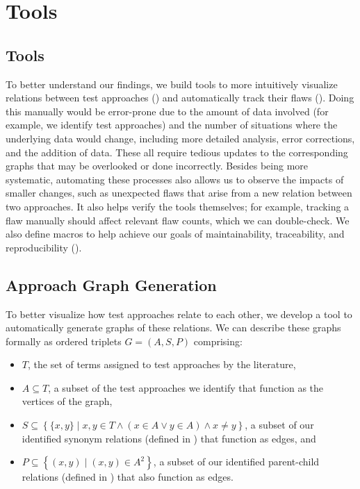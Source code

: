 \ifnotpaper
    \section{Tools}
\else
    \subsection{Tools}
\fi
\label{tools}

\ifnotpaper
    To better understand our findings, we build tools to more intuitively
    visualize relations between test approaches () and
    automatically track their flaws (). Doing
    this manually would be error-prone due to the amount of data involved (for
    example, we identify \approachCount{} test approaches) and the number of
    situations where the underlying data would change, including more detailed
    analysis, error corrections, and the addition of data. These all require
    tedious updates to the corresponding graphs that may be overlooked or done
    incorrectly. Besides being more systematic, automating these processes also
    allows us to observe the impacts of smaller changes, such as unexpected
    flaws that arise from a new relation between two approaches. It
    also helps verify the tools themselves; for example, tracking a flaw
    manually should affect relevant flaw counts, which we can double-check.
    We also define macros to help achieve our goals of
    maintainability, traceability, and reproducibility ().

    \subsection{Approach Graph Generation}
    \label{graph-gen}
\fi

To better visualize how test approaches relate to each other, we
develop a tool to automatically generate graphs of these relations.
\ifnotpaper We can describe these graphs formally as ordered triplets
    $G = (A, S, P)$ comprising:
    \begin{itemize}
        \item $T$, the set of terms assigned to test approaches by the
              literature,
        \item $A \subseteq T$, a subset of the \approachCount{} test approaches
              we identify that function as the vertices of the graph,
        \item $S \subseteq \left\{ \{x, y\} \mid x, y \in T \land
                  (x \in A \lor y \in A) \land x \neq y \right\}$,
              a subset of our identified synonym relations (defined in
              ) that function as edges, and
        \item $P \subseteq \left\{(x,y) \mid (x, y) \in A^2 \right\}$, a subset
              of our identified parent-child relations (defined in
              ) that also function as edges.
    \end{itemize}

